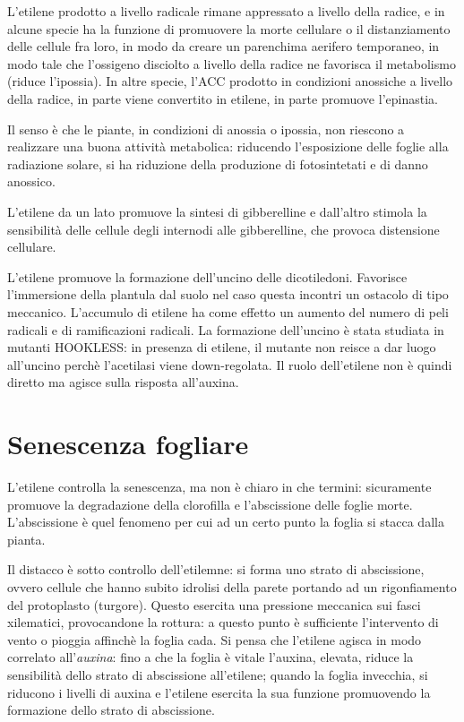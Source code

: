\documentclass[a4paper,12pt]{book}
\begin{document}
L'etilene prodotto a livello radicale rimane appressato a livello della radice, e in alcune specie ha la funzione di promuovere la morte cellulare o il distanziamento delle cellule fra loro, in modo da creare un parenchima aerifero temporaneo, in modo tale che l'ossigeno disciolto a livello della radice ne favorisca il metabolismo (riduce l'ipossia). In altre specie, l'ACC prodotto in condizioni anossiche a livello della radice, in parte viene convertito in etilene, in parte promuove l'epinastia. 

Il senso è che le piante, in condizioni di anossia o ipossia, non riescono a realizzare una buona attività metabolica: riducendo l'esposizione delle foglie alla radiazione solare, si ha riduzione della produzione di fotosintetati e di danno anossico.

L'etilene da un lato promuove la sintesi di gibberelline e dall'altro stimola la sensibilità delle cellule degli internodi alle gibberelline, che provoca distensione cellulare. 


L'etilene promuove la formazione dell'uncino delle dicotiledoni. Favorisce l'immersione della plantula dal suolo nel caso questa incontri un ostacolo di tipo meccanico. L'accumulo di etilene ha come effetto un aumento del numero di peli radicali e di ramificazioni radicali.
La formazione dell'uncino è stata studiata in mutanti HOOKLESS: in presenza di etilene, il mutante non reisce a dar luogo all'uncino perchè l'acetilasi viene down-regolata. Il ruolo dell'etilene non è quindi diretto ma agisce sulla risposta all'auxina. 

\section{Senescenza fogliare}
L'etilene controlla la senescenza, ma non è chiaro in che termini: sicuramente promuove la degradazione della clorofilla e l'abscissione delle foglie morte. L'abscissione è quel fenomeno per cui ad un certo punto la foglia si stacca dalla pianta.

Il distacco è sotto controllo dell'etilemne: si forma uno strato di abscissione, ovvero cellule che hanno subito idrolisi della parete portando ad un rigonfiamento del protoplasto (turgore). Questo esercita una pressione meccanica sui fasci xilematici, provocandone la rottura: a questo punto è sufficiente l'intervento di vento o pioggia affinchè la foglia cada. Si pensa che l'etilene agisca in modo correlato all'\emph{auxina}: fino a che la foglia è vitale l'auxina, elevata, riduce la sensibilità dello strato di abscissione all'etilene; quando la foglia invecchia, si riducono i livelli di auxina e l'etilene esercita la sua funzione promuovendo la formazione dello strato di abscissione.
\end{document}
